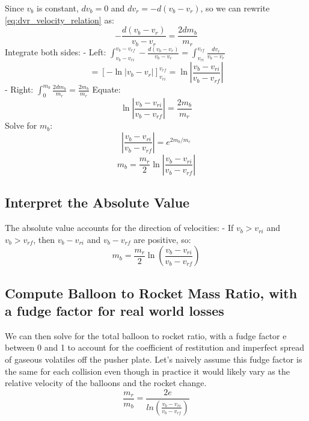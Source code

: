 \documentclass{article}
\begin{document}
Since \(v_b\) is constant,  \(dv_b = 0\) and  \(dv_r = -d(v_b-v_r)\), so we can rewrite \autoref{eq:dvr_velocity_relation} as:
\[
-\frac{d(v_b - v_r)}{v_b - v_r} = \frac{2 dm_b}{m_r}
\]
Integrate both sides:
- Left: \( \int_{v_b - v_{ri}}^{v_b - v_{rf}} -\frac{d(v_b - v_r)}{v_b - v_r} = \int_{v_{ri}}^{v_{rf}} \frac{dv_r}{v_b - v_r} \)
\[
= \left[ -\ln|v_b - v_r| \right]_{v_{ri}}^{v_{rf}} = \ln \left| \frac{v_b - v_{ri}}{v_b - v_{rf}} \right|
\]
- Right: \( \int_0^{m_b} \frac{2 dm_b}{m_r} = \frac{2 m_b}{m_r} \)
Equate:
\[
\ln \left| \frac{v_b - v_{ri}}{v_b - v_{rf}} \right| = \frac{2 m_b}{m_r}
\]
Solve for \( m_b \):
\[
\left| \frac{v_b - v_{ri}}{v_b - v_{rf}} \right| = e^{2 m_b / m_r}
\]
\begin{equation}
m_b = \frac{m_r}{2} \ln \left| \frac{v_b - v_{ri}}{v_b - v_{rf}} \right| 
\end{equation}
\subsection{Interpret the Absolute Value}   
The absolute value accounts for the direction of velocities:
- If \( v_b > v_{ri} \) and \( v_b > v_{rf} \),  then \( v_b - v_{ri} \) and \( v_b - v_{rf} \) are positive, so:
\[
m_b = \frac{m_r}{2} \ln \left( \frac{v_b - v_{ri}}{v_b - v_{rf}} \right)
\]
\subsection{Compute Balloon to Rocket Mass Ratio, with a fudge factor for real world losses}

We can then solve for the total balloon to rocket ratio, with a fudge factor e between 0 and 1 to account for the coefficient of restitution and imperfect spread of gaseous volatiles off the pusher plate.   Let's naively assume this fudge factor is the same for each collision even though in practice it would likely vary as the relative velocity of the balloons and the rocket change.
\begin{equation}
\frac{m_r}{m_b} = \frac{2e}{ln(\frac{v_b-v_{ri}}{v_b-v_{rf}})}\label{eq:balloon_ratio}
\end{equation}
\end{document}

